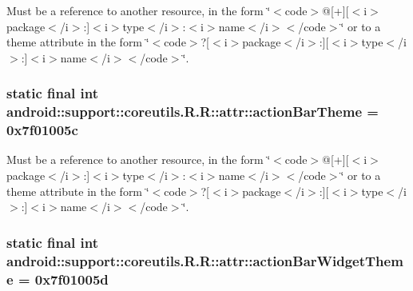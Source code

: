 Must be a reference to another resource, in the form \char`\"{}$<$code$>$@\mbox{[}+\mbox{]}\mbox{[}$<$i$>$package$<$/i$>$:\mbox{]}$<$i$>$type$<$/i$>$:$<$i$>$name$<$/i$>$$<$/code$>$\char`\"{} or to a theme attribute in the form \char`\"{}$<$code$>$?\mbox{[}$<$i$>$package$<$/i$>$:\mbox{]}\mbox{[}$<$i$>$type$<$/i$>$:\mbox{]}$<$i$>$name$<$/i$>$$<$/code$>$\char`\"{}. \hypertarget{classandroid_1_1support_1_1coreutils_1_1_r_1_1attr_87a28f5a0f39a2e731985da493857359}{
\subsubsection[{actionBarTheme}]{\setlength{\rightskip}{0pt plus 5cm}static final int android::support::coreutils.R.R::attr::actionBarTheme = 0x7f01005c}}
\label{classandroid_1_1support_1_1coreutils_1_1_r_1_1attr_87a28f5a0f39a2e731985da493857359}


Must be a reference to another resource, in the form \char`\"{}$<$code$>$@\mbox{[}+\mbox{]}\mbox{[}$<$i$>$package$<$/i$>$:\mbox{]}$<$i$>$type$<$/i$>$:$<$i$>$name$<$/i$>$$<$/code$>$\char`\"{} or to a theme attribute in the form \char`\"{}$<$code$>$?\mbox{[}$<$i$>$package$<$/i$>$:\mbox{]}\mbox{[}$<$i$>$type$<$/i$>$:\mbox{]}$<$i$>$name$<$/i$>$$<$/code$>$\char`\"{}. \hypertarget{classandroid_1_1support_1_1coreutils_1_1_r_1_1attr_55c2b38e2a592b84cb20eb75d2d7d2cc}{
\subsubsection[{actionBarWidgetTheme}]{\setlength{\rightskip}{0pt plus 5cm}static final int android::support::coreutils.R.R::attr::actionBarWidgetTheme = 0x7f01005d}}
\label{classandroid_1_1support_1_1coreutils_1_1_r_1_1attr_55c2b38e2a592b84cb20eb75d2d7d2cc}



